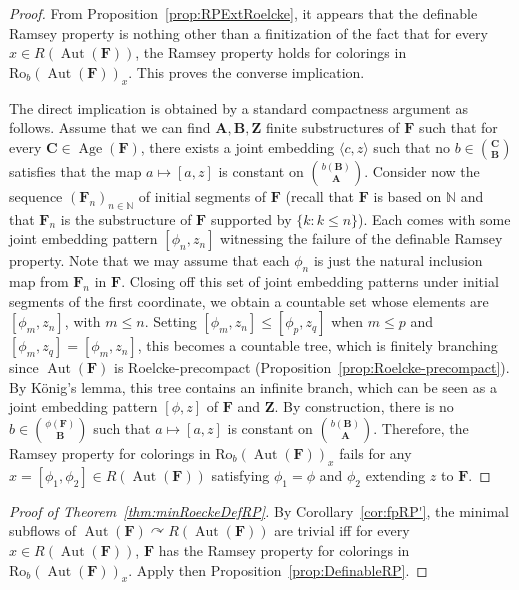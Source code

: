 \documentclass[11pt]{article}
\theoremstyle{definition}
\numberwithin{equation}{section}
\numberwithin{figure}{section}
\numberwithin{table}{section}
\newcommand{\N}{\mathbb{N}}
\newcommand*{\mA}{\mathbf{A}}
\newcommand*{\mB}{\mathbf{B}}
\newcommand*{\mC}{\mathbf{C}}
\newcommand*{\mF}{\mathbf{F}}
\newcommand*{\mZ}{\mathbf{Z}}
\DeclareMathOperator{\Aut}{Aut}
\DeclareMathOperator{\Age}{Age}
\newcommand{\actson}{\curvearrowright}
\newcommand{\ROB}{\mathrm{Ro}_{b}}
\begin{document}
\begin{proof}
From Proposition~\ref{prop:RPExtRoelcke}, it appears that the definable Ramsey property is nothing other than a finitization of the fact that for every $x\in R(\Aut(\mF))$, the Ramsey property holds for colorings in $\ROB(\Aut(\mF))_{x}$. This proves the converse implication.

The direct implication is obtained by a standard compactness argument as follows. Assume that we can find $\mA, \mB, \mZ$ finite substructures of $\mF$ such that for every $\mC\in \Age(\mF)$, there exists a joint embedding $\langle c,z \rangle$ such that no $b\in \binom{\mC}{\mB}$ satisfies that the map $a\mapsto [a,z]$ is constant on $\binom{b(\mB)}{\mA}$. Consider now the sequence $(\mF_{n})_{n\in \N}$ of initial segments of $\mF$ (recall that $\mF$ is based on $\N$ and that $\mF_{n}$ is the substructure of $\mF$ supported by $\{ k : k\leq n\}$). Each comes with some joint embedding pattern $[\phi_{n}, z_{n}]$ witnessing the failure of the definable Ramsey property. Note that we may assume that each $\phi_{n}$ is just the natural inclusion map from $\mF_{n}$ in $\mF$. Closing off this set of joint embedding patterns under initial segments of the first coordinate, we obtain a countable set whose elements are $[\phi_{m}, z_{n}]$, with $m\leq n$. Setting $[\phi_{m}, z_{n}] \leq [\phi_{p}, z_{q}]$ when $m\leq p$ and $[\phi_{m},z_{q}]=[\phi_{m},z_{n}]$, this becomes a countable tree, which is finitely branching since $\Aut(\mF)$ is Roelcke-precompact (Proposition~\ref{prop:Roelcke-precompact}). By K\"onig's lemma, this tree contains an infinite branch, which can be seen as a joint embedding pattern $[\phi, z]$ of $\mF$ and $\mZ$. By construction, there is no $b\in \binom{\phi(\mF)}{\mB}$ such that $a\mapsto [a,z]$ is constant on $\binom{b(\mB)}{\mA}$. Therefore, the Ramsey property for colorings in $\ROB(\Aut(\mF))_{x}$ fails for any $x=[\phi_{1}, \phi_{2}]\in R(\Aut(\mF))$ satisfying $\phi_{1}=\phi$ and $\phi_{2}$ extending $z$ to $\mF$.
\end{proof}



\begin{proof}[Proof of Theorem~\ref{thm:minRoeckeDefRP}]
By Corollary~\ref{cor:fpRP'}, the minimal subflows of $\Aut(\mF)\actson R(\Aut(\mF))$ are trivial iff for every $x\in R(\Aut(\mF))$, $\mF$ has the Ramsey property for colorings in $\ROB(\Aut(\mF))_{x}$. Apply then Proposition~\ref{prop:DefinableRP}.
\end{proof}
\end{document}
